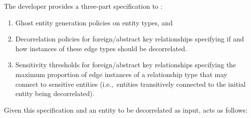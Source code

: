 The developer provides a three-part specification to \sys{}: 
\begin{enumerate}
    \item Ghost entity generation policies on entity types, and
    \item Decorrelation policies for foreign/abstract key relationships specifying if and how
        instances of these edge types should be decorrelated.
    \item Sensitivity thresholds for foreign/abstract key relationships specifying the maximum
        proportion of edge instances of a relationship type that may connect to sensitive
        entities (i.e.,\ entities transitively connected to the initial entity being
        decorrelated). 
\end{enumerate}

Given this specification and an entity to be decorrelated as input, \sys{} acts as follows:

